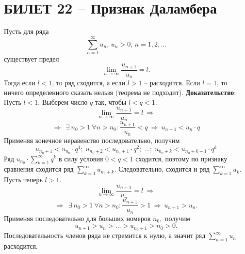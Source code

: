 \documentclass{article}
\begin{document}
\section{БИЛЕТ 22 -- Признак Даламбера}
Пусть для ряда 
$$ \sum_{n=1}^{\infty}u_{n},\,u_{n}>0,\,n=1,2,\ldots $$
существует предел
$$ \lim_{n\to\infty}\frac{u_{n+1}}{u_{n}}=l. $$
Тогда если $l<1$, то ряд сходится, а если $l>1$ --  расходится.
\newline
\newline
Если $l=1$, то ничего определенного сказать нельзя (теорема не подходит).
\newline
\newline
\textbf{Доказательство}:
\newline
\newline
Пусть $l<1.$ Выберем число $q$ так, чтобы $l<q<1.$
$$ \lim_{n\to\infty}\frac{u_{n+1}}{u_{n}}=l \:\Rightarrow$$
$$\Rightarrow\:\:\exists\:n_{0}>1\:\forall n>n_{0}:\frac{u_{n+1}}{u_{n}}<q\:\Rightarrow\:u_{n+1}<u_{n}\cdot q$$
Применяя конечное неравенство последовательно, получим
$$ u_{n_{0}+1}<u_{n_{0}}\cdot q^{1};\; u_{n_{0}+2}<u_{n_{0}+1}\cdot q^{2};\;\ldots;\; u_{n_{0}+k}<u_{n_{0}+k-1}\cdot q^{k}$$
Ряд $u_{n_{0}}\cdot\sum_{k=1}^{\infty}q^{k}$ в силу условия $0<q<1$ сходится, поэтому по признаку сравнения сходится ряд $\sum_{k=1}^{\infty}u_{n_{0}+k}.$ Следовательно, сходится и ряд $\sum_{k=1}^{\infty}u_{k}.$
\newline
\newline
\newline
Пусть теперь $l>1.$
$$ \lim_{n\to\infty}\frac{u_{n+1}}{u_{n}}=l \:\Rightarrow$$
$$\Rightarrow\:\:\exists\:n_{0}>1\:\forall n>n_{0}:\frac{u_{n+1}}{u_{n}}>1\:\Rightarrow\:u_{n+1}>u_{n}.$$
Применяя последовательно для больших номеров $n_{0},$ получим
$$ u_{n+1}>u_{n}>\ldots>u_{n_{0}+1}>n_{0}>0.$$
Последовательность членов ряда не стремится к нулю, а значит ряд $\sum_{n=1}^{\infty}u_{n}$ расходится.
\newpage
\end{document}
